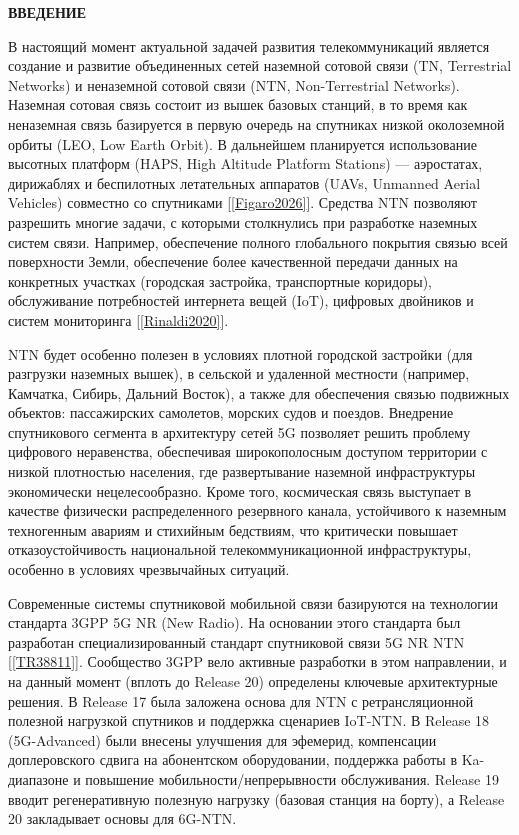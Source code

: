 \newpage
\begin{center}
  \textbf{\large ВВЕДЕНИЕ}
\end{center}

В настоящий момент актуальной задачей развития телекоммуникаций является создание и развитие объединенных сетей
наземной сотовой связи (TN, Terrestrial Networks) и неназемной сотовой связи (NTN, Non-Terrestrial Networks).
Наземная сотовая связь состоит из вышек базовых станций, в то время как неназемная связь базируется в первую очередь
на спутниках низкой околоземной орбиты (LEO, Low Earth Orbit). В дальнейшем планируется использование высотных платформ (HAPS, High Altitude Platform Stations)
— аэростатах, дирижаблях и беспилотных летательных аппаратов (UAVs, Unmanned Aerial Vehicles) совместно со спутниками [\ref{Figaro2026}].
Средства NTN позволяют разрешить многие задачи, с которыми столкнулись при разработке наземных систем связи.
Например, обеспечение полного глобального покрытия связью всей поверхности Земли,
обеспечение более качественной передачи данных на конкретных участках (городская застройка, транспортные коридоры),
обслуживание потребностей интернета вещей (IoT), цифровых двойников и систем мониторинга [\ref{Rinaldi2020}].

NTN будет особенно полезен в условиях плотной городской застройки (для разгрузки наземных вышек),
в сельской и удаленной местности (например, Камчатка, Сибирь, Дальний Восток),
а также для обеспечения связью подвижных объектов: пассажирских самолетов, морских судов и поездов.
Внедрение спутникового сегмента в архитектуру сетей 5G позволяет решить проблему цифрового неравенства,
обеспечивая широкополосным доступом территории с низкой плотностью населения,
где развертывание наземной инфраструктуры экономически нецелесообразно. 
Кроме того, космическая связь выступает в качестве физически распределенного резервного канала, 
устойчивого к наземным техногенным авариям и стихийным бедствиям, что критически повышает отказоустойчивость 
национальной телекоммуникационной инфраструктуры, особенно в условиях чрезвычайных ситуаций.

Современные системы спутниковой мобильной связи базируются на технологии стандарта 3GPP 5G NR (New Radio).
На основании этого стандарта был разработан специализированный стандарт спутниковой связи 5G NR NTN [\ref{TR38811}].
Сообщество 3GPP вело активные разработки в этом направлении, и на данный момент (вплоть до Release 20)
определены ключевые архитектурные решения. В Release 17 была заложена основа для NTN 
с ретрансляционной полезной нагрузкой спутников и поддержка сценариев IoT-NTN.
В Release 18 (5G-Advanced) были внесены улучшения для эфемерид, компенсации доплеровского сдвига на абонентском оборудовании,
поддержка работы в Ka-диапазоне и повышение мобильности/непрерывности обслуживания.
Release 19 вводит регенеративную полезную нагрузку (базовая станция на борту), а
Release 20 закладывает основы для 6G-NTN.

